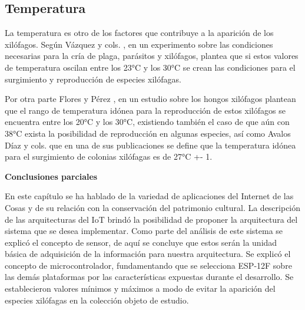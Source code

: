     \subsection{Temperatura}

    La temperatura es otro de los factores que contribuye a la aparición de los xilófagos. Según Vázquez y cols. \cite{vazquez1999avetianella}, en un experimento sobre las condiciones necesarias para la cría de plaga, parásitos y xilófagos, plantea que si estos valores de temperatura oscilan entre los 23°C y los 30°C se crean las condiciones para el surgimiento y reproducción de especies xilófagas. 

    Por otra parte Flores y Pérez \cite{floresDurabilidadNaturalDiez1987a}, en un estudio sobre los hongos xilófagos plantean que el rango de temperatura idónea para la reproducción de estos xilófagos se encuentra entre los 20°C y los 30°C, existiendo también el caso de que aún con 38°C exista la posibilidad de reproducción en algunas especies, así como Avalos Díaz y cols. \cite{avalosdiazInfluenciaDosHongos2020} que en una de sus publicaciones se define que la temperatura idónea para el surgimiento de colonias xilófagas es de 27°C +- 1.\\ 

    \newpage
    \textbf{\large Conclusiones parciales}

    En este capítulo se ha hablado de la variedad de aplicaciones del Internet de las Cosas y de su relación con la conservación del patrimonio cultural. La descripción de las arquitecturas del IoT brindó la posibilidad de proponer la arquitectura del sistema que se desea implementar. Como parte del análisis de este sistema se explicó el concepto de sensor, de aquí se concluye que estos serán la unidad básica de adquisición de la información para nuestra arquitectura.
    Se explicó el concepto de microcontrolador, fundamentando que se selecciona ESP-12F sobre las demás plataformas por las características expuestas durante el desarrollo. 
    Se establecieron valores mínimos y máximos a modo de evitar la aparición del especies xilófagas en la colección objeto de estudio.
